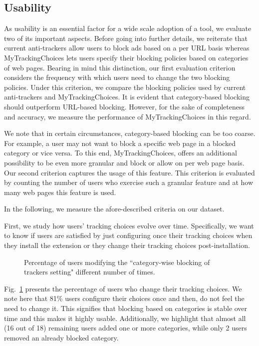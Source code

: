 \documentclass[conference]{IEEEtran}
\begin{document}
\subsection{Usability}
\label{subsec:usability}
As usability is an essential factor for a wide scale adoption of a tool, we evaluate two of its important aspects.
Before going into further details, we reiterate that current anti-trackers allow 
users to block ads based on a per URL basis whereas MyTrackingChoices lets users specify
their blocking policies based on categories of web pages.
Bearing in mind this distinction, our first evaluation criterion considers the 
frequency with which users need to change the two blocking policies.
Under this criterion, we compare the blocking policies used by current anti-trackers and MyTrackingChoices.
It is evident that category-based blocking should outperform URL-based blocking.
However, for the sake of completeness and accuracy, we measure the performance of MyTrackingChoices in this regard.


We note that in certain circumstances, category-based blocking can be too coarse.
For example, a user may not want to block a specific web page in a blocked category or vice versa.
To this end, MyTrackingChoices, offers an additional possibility to be even more granular and block or allow on per web page basis.
Our second criterion captures the usage of this feature.
This criterion is evaluated by counting the number of users who exercise such a granular feature and at how many web pages this feature is used.


In the following, we measure the afore-described criteria on our dataset. 


First, we study how users' tracking choices evolve over time.
Specifically, we want to know if users are satisfied by just configuring once their tracking choices when they install the extension or 
they change their tracking choices post-installation.
\begin{figure}[t]
\centering



\caption{Percentage of users modifying the ``category-wise blocking of trackers setting" different number of times.}
\label{fig:evolution_blocked_cats}
\end{figure}
Fig.~\ref{fig:evolution_blocked_cats} presents the percentage of users who change their tracking choices.
We note here that 81\% users configure their choices once and then, do not feel the need to change it.
This signifies that blocking based on categories is stable over time and this makes it highly usable.
Additionally, we highlight that almost all (16 out of 18) remaining users added one or more categories, 
while only 2 users removed an already blocked category.
\end{document}
